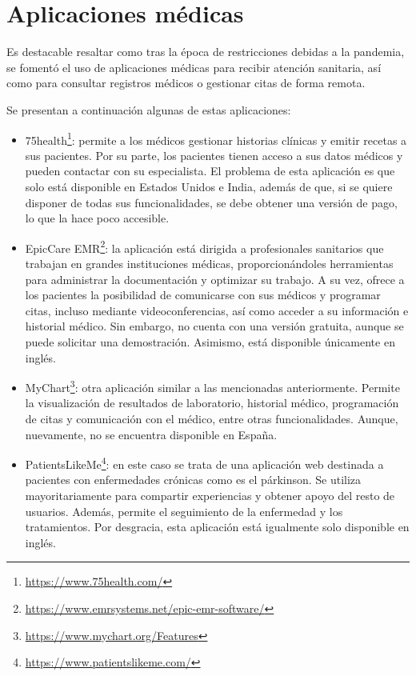\section{Aplicaciones médicas}
Es destacable resaltar como tras la época de restricciones debidas a la pandemia, se fomentó el uso de aplicaciones médicas para recibir atención sanitaria, así como para consultar registros médicos o gestionar citas de forma remota.

Se presentan a continuación algunas de estas aplicaciones:
\begin{itemize}
    \item 75health\footnote{\url{https://www.75health.com/}}: permite a los médicos gestionar historias clínicas y emitir recetas a sus pacientes. Por su parte, los pacientes tienen acceso a sus datos médicos y pueden contactar con su especialista. El problema de esta aplicación es que solo está disponible en Estados Unidos e India, además de que, si se quiere disponer de todas sus funcionalidades, se debe obtener una versión de pago, lo que la hace poco accesible.
    
    \item EpicCare EMR\footnote{\url{https://www.emrsystems.net/epic-emr-software/}}: la aplicación está dirigida a profesionales sanitarios que trabajan en grandes instituciones médicas, proporcionándoles herramientas para administrar la documentación y optimizar su trabajo. A su vez, ofrece a los pacientes la posibilidad de comunicarse con sus médicos y programar citas, incluso mediante videoconferencias, así como acceder a su información e historial médico. Sin embargo, no cuenta con una versión gratuita, aunque se puede solicitar una demostración. Asimismo, está disponible únicamente en inglés.
    
    \item MyChart\footnote{\url{https://www.mychart.org/Features}}: otra aplicación similar a las mencionadas anteriormente. Permite la visualización de resultados de laboratorio, historial médico, programación de citas y comunicación con el médico, entre otras funcionalidades. Aunque, nuevamente, no se encuentra disponible en España.
    
    \item PatientsLikeMe\footnote{\url{https://www.patientslikeme.com/}}: en este caso se trata de una aplicación web destinada a pacientes con enfermedades crónicas como es el párkinson. Se utiliza mayoritariamente para compartir experiencias y obtener apoyo del resto de usuarios. Además, permite el seguimiento de la enfermedad y los tratamientos. Por desgracia, esta aplicación está igualmente solo disponible en inglés.
\end{itemize}




